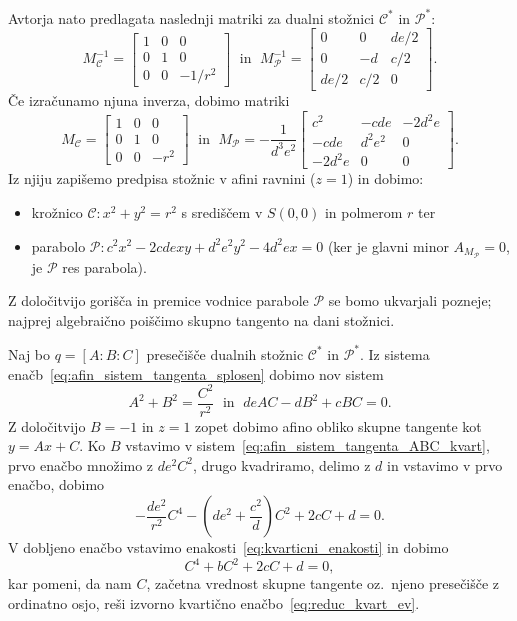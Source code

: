 Avtorja nato predlagata naslednji matriki za dualni stožnici $\mathcal{C^*}$ in $\mathcal{P^*}$:
$$ M^{-1}_\mathcal{C} =
    \begin{bmatrix}
        1 & 0 & 0\\
        0 & 1 & 0\\
        0 & 0 & -1/r^2
    \end{bmatrix}
\; \text{ in } \; M^{-1}_\mathcal{P} =
    \begin{bmatrix}
        0 & 0 & de/2\\
        0 & -d & c/2\\
        de/2 & c/2 & 0
    \end{bmatrix}.
$$
Če izračunamo njuna inverza, dobimo matriki
$$ M_\mathcal{C} =
    \begin{bmatrix}
        1 & 0 & 0\\
        0 & 1 & 0\\
        0 & 0 & -r^2
    \end{bmatrix}
    \; \text{ in } \; M_\mathcal{P} = -\frac{1}{d^3e^2}
    \begin{bmatrix}
        c^2 & -cde & -2d^2e\\
        -cde & d^2e^2 & 0\\
        -2d^2e & 0 & 0
    \end{bmatrix}.
$$
Iz njiju zapišemo predpisa stožnic v afini ravnini ($z = 1$) in dobimo:
\begin{itemize}
    \item krožnico $\mathcal{C}: x^2 + y^2 = r^2$ s središčem v $S(0,0)$ in polmerom $r$ ter
    \item parabolo $\mathcal{P}: c^2x^2 - 2cdexy + d^2e^2y^2 - 4d^2ex = 0$ (ker je glavni minor $A_{M_\mathcal{P}} = 0$, je $\mathcal{P}$ res parabola).
\end{itemize}
Z določitvijo gorišča in premice vodnice parabole $\mathcal{P}$ se bomo ukvarjali pozneje; najprej algebraično poiščimo skupno tangento na dani stožnici.

Naj bo $q = [A : B : C]$ presečišče dualnih stožnic $\mathcal{C^*}$ in $\mathcal{P^*}$. Iz sistema enačb~\ref{eq:afin_sistem_tangenta_splosen} dobimo nov sistem
\begin{equation}
    \label{eq:afin_sistem_tangenta_ABC_kvart}
    A^2 + B^2 = \frac{C^2}{r^2} \; \text{ in } \; deAC - dB^2 + cBC = 0.
\end{equation}
Z določitvijo $B = -1$ in $z = 1$ zopet dobimo afino obliko skupne tangente kot $y = Ax + C$. Ko $B$ vstavimo v sistem~\ref{eq:afin_sistem_tangenta_ABC_kvart}, prvo enačbo množimo z $de^2C^2$, drugo kvadriramo, delimo z $d$ in vstavimo v prvo enačbo, dobimo
$$ - \frac{de^2}{r^2}C^4 - (de^2 + \frac{c^2}{d})C^2 + 2cC + d = 0.$$
V dobljeno enačbo vstavimo enakosti~\ref{eq:kvarticni_enakosti} in dobimo
$$C^4 + bC^2 + 2cC + d = 0,$$
kar pomeni, da nam $C$, začetna vrednost skupne tangente oz.\ njeno presečišče z ordinatno osjo, reši izvorno kvartično enačbo~\ref{eq:reduc_kvart_ev}.

